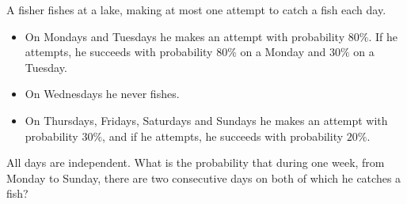 A fisher fishes at a lake, making at most one attempt to catch a fish each day.
\begin{itemize}
\item On Mondays and Tuesdays he makes an attempt with probability $80\%$. If he attempts, he succeeds with probability $80\%$ on a Monday and $30\%$ on a Tuesday.
\item On Wednesdays he never fishes.
\item On Thursdays, Fridays, Saturdays and Sundays he makes an attempt with probability $30\%$, and if he attempts, he succeeds with probability $20\%$.
\end{itemize}
All days are independent. What is the probability that during one week, from Monday to Sunday, there are two consecutive days on both of which he catches a fish?
